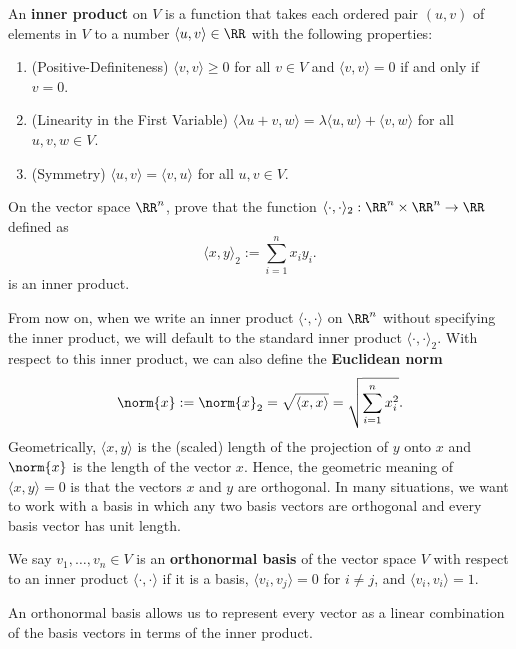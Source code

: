 \documentclass[11pt]{article}
\begin{document}
\begin{defn} \label{definition-inner-product}
    An \textbf{inner product} on $V$ is a function that takes each ordered pair $(u, v)$ of elements in $V$ to a number $\langle u, v \rangle \in \RR$ with the following properties:
    \begin{enumerate}[label = (\roman*)]
        \item (Positive-Definiteness) $\langle v, v \rangle \geq 0$ for all $v \in V$ and $\langle v, v \rangle = 0$ if and only if $v = 0$. 
        \item (Linearity in the First Variable) $\langle \lambda u + v, w \rangle = \lambda \langle u, w \rangle + \langle v, w \rangle$ for all $u, v, w \in V$. 
        \item (Symmetry) $\langle u, v \rangle = \langle v, u \rangle$ for all $u, v \in V$.
    \end{enumerate}    
\end{defn}
\begin{prob} [10 points] \label{problem-standard-inner-product}
    On the vector space $\RR^n$, prove that the function $\langle \cdot, \cdot \rangle_2 : \RR^n \times \RR^n \to \RR$ defined as 
    \[
        \langle x, y \rangle_2 := \sum_{i = 1}^n x_i y_i. 
    \]
    is an inner product. 
\end{prob}
From now on, when we write an inner product $\langle \cdot, \cdot \rangle$ on $\RR^n$ without specifying the inner product, we will default to the standard inner product $\langle \cdot, \cdot \rangle_2$. With respect to this inner product, we can also define the \textbf{Euclidean norm}
\[  
    \norm{x} := \norm{x}_2 = \sqrt{\langle x, x \rangle} = \sqrt{\sum_{i = 1}^n x_i^2}.
\]
Geometrically, $\langle x, y \rangle$ is the (scaled) length of the projection of $y$ onto $x$ and $\norm{x}$ is the length of the vector $x$. Hence, the geometric meaning of $\langle x, y \rangle = 0$ is that the vectors $x$ and $y$ are orthogonal. In many situations, we want to work with a basis in which any two basis vectors are orthogonal and every basis vector has unit length.
\begin{defn}
    We say $v_1, \ldots, v_n \in V$ is an \textbf{orthonormal basis} of the vector space $V$ with respect to an inner product $\langle \cdot, \cdot \rangle$ if it is a basis, $\langle v_i, v_j \rangle = 0$ for $i \neq j$, and $\langle v_i, v_i \rangle = 1$. 
\end{defn} 

An orthonormal basis allows us to represent every vector as a linear combination of the basis vectors in terms of the inner product. 
\end{document}
